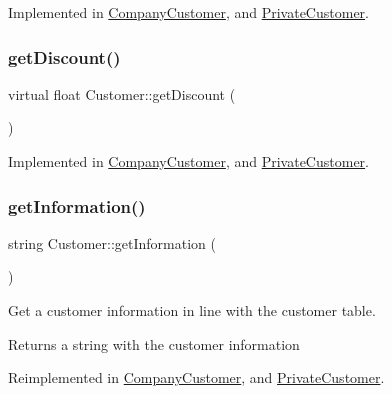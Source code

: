Implemented in \hyperlink{classCompanyCustomer_a29b36593a5cc93f3c6d9f9372b261bba}{Company\+Customer}, and \hyperlink{classPrivateCustomer_a07d4d3e5995758b2407b8a81e35e579a}{Private\+Customer}.

\hypertarget{classCustomer_a55df4714c5be2c2978069eda6bc32ace}{}\label{classCustomer_a55df4714c5be2c2978069eda6bc32ace} 
\subsubsection{\texorpdfstring{get\+Discount()}{getDiscount()}}
{\footnotesize\ttfamily virtual float Customer\+::get\+Discount (\begin{DoxyParamCaption}{ }\end{DoxyParamCaption})\hspace{0.3cm}{\ttfamily [pure virtual]}}



Implemented in \hyperlink{classCompanyCustomer_aa9af04558e4c90df0c2379456ae7b626}{Company\+Customer}, and \hyperlink{classPrivateCustomer_a4757f4e3cb5e0e74891e8f1b37a07277}{Private\+Customer}.

\hypertarget{classCustomer_ae13da50be281b8f266f463a2166cad66}{}\label{classCustomer_ae13da50be281b8f266f463a2166cad66} 
\subsubsection{\texorpdfstring{get\+Information()}{getInformation()}}
{\footnotesize\ttfamily string Customer\+::get\+Information (\begin{DoxyParamCaption}{ }\end{DoxyParamCaption})\hspace{0.3cm}{\ttfamily [virtual]}}

Get a customer information in line with the customer table. \begin{DoxyReturn}{Returns}
a string with the customer information 
\end{DoxyReturn}


Reimplemented in \hyperlink{classCompanyCustomer_a43dcc60f21c2b48e4af587314653d94d}{Company\+Customer}, and \hyperlink{classPrivateCustomer_afcf22c4a25e9c961d045aa5a0d8d9fd2}{Private\+Customer}.

\hypertarget{classCustomer_a1bda0c5a9b2f4bf0c3314832e95f2566}{}\label{classCustomer_a1bda0c5a9b2f4bf0c3314832e95f2566} 
